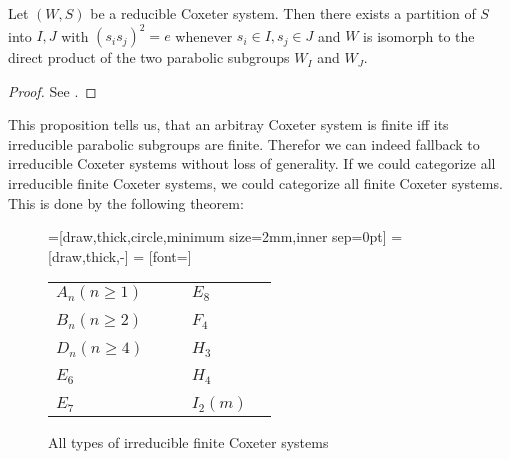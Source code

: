 \begin{prop}
	\label{reducible-coxeter-systems-isomorph-to-parabolic-subgroups}
	Let $(W,S)$ be a reducible Coxeter system. Then there exists a partition of $S$ into $I,J$ with $(s_i s_j)^2 = e$ whenever $s_i \in I, s_j \in J$ and $W$ is isomorph to the direct product of the two parabolic subgroups $W_I$ and $W_J$.

	\begin{proof}
		See \cite[Proposition 6.1]{humphreys:coxeter}.
	\end{proof}
\end{prop}

This proposition tells us, that an arbitray Coxeter system is finite iff its irreducible parabolic subgroups are finite. Therefor we can indeed fallback to irreducible Coxeter systems without loss of generality. If we could categorize all irreducible finite Coxeter systems, we could categorize all finite Coxeter systems. This is done by the following theorem:

\begin{figure}
	\label{finite-coxeter-systems}
	\centering
	=[draw,thick,circle,minimum size=2mm,inner sep=0pt]
	 = [draw,thick,-]
	 = [font=\small]

	\begin{tabular}{MMcMM}
	$A_n (n \geq 1)$
	&
	\An
	&
	\hspace*{\cgpadh}
	&
	$E_8$
	&
	\Eeight
	\\
	\vspace*{\cgpadv}
	\\
	$B_n (n \geq 2)$
	&
	\Bn
	&
	\hspace*{\cgpadh}
	&
	$F_4$
	&
	\Ffour
	\\
	\vspace*{\cgpadv}
	\\
	$D_n (n \geq 4)$
	&
	\Dn
	&
	\hspace*{\cgpadh}
	&
	$H_3$
	&
	\Hthree
	\\
	\vspace*{\cgpadv}
	\\
	$E_6$
	&
	\Esix
	&
	\hspace*{\cgpadh}
	&
	$H_4$
	&
	\Hfour
	\\
	\vspace*{\cgpadv}
	\\
	$E_7$
	&
	\Eseven
	&
	\hspace*{\cgpadh}
	&
	$I_2(m)$
	&
	\Itwom
	\end{tabular}
	\caption{All types of irreducible finite Coxeter systems}
\end{figure}

